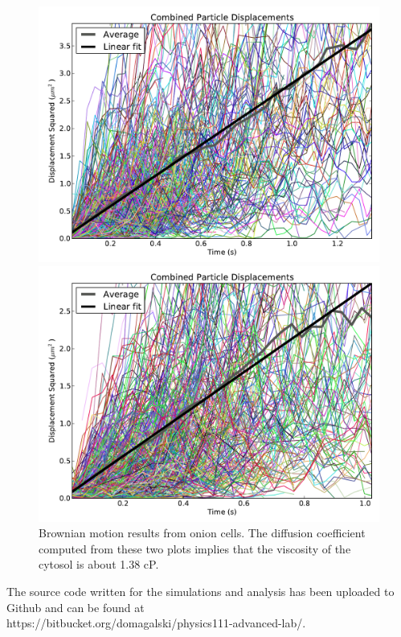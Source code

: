 \documentclass[11pt,letterpaper]{article}
\begin{document}
\begin{figure}
    \centering
    \begin{minipage}[t]{0.485\textwidth}
        \centering
        \includegraphics[width=\textwidth]{figures/red_onion_test_4.pdf}
    \end{minipage}
    \begin{minipage}[t]{0.485\textwidth}
        \centering
        \includegraphics[width=\textwidth]{figures/red_onion_test_5.pdf}
    \end{minipage}
    \caption{Brownian motion results from onion cells. The diffusion coefficient
    computed from these two plots implies that the viscosity of the cytosol is
    about 1.38 cP.}
    \label{onion_brownian}
\end{figure}

The source code written for the simulations and analysis has been uploaded to
Github and can be found at \cite{Bitbucket}\\
https://bitbucket.org/domagalski/physics111-advanced-lab/.

\newpage

{}
\end{document}
